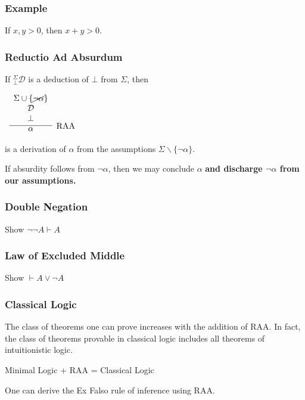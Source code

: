 \documentclass{beamer}
\theoremstyle{indentDefn} \newtheorem{defn}[]{Definition}
\begin{document}
\begin{frame}
	\frametitle{Example}

	If $x,y > 0$, then $x + y > 0$. 

	\vspace{6cm}

\end{frame}

\begin{frame}
	\frametitle{Reductio Ad Absurdum}
	
	If $^{\Sigma}_{\bot}\mathcal{D}$ is a deduction of $\bot$ from $\Sigma$, then
	
	\begin{center}		
		$\begin{array}{c}		
		\infer[\RAA]{\alpha}
		{\begin{array}{c} \Sigma \cup \{\cancel{\lnot\alpha}\} \\ \mathcal{D} \\ \bot \end{array}}
		\end{array}$
	\end{center}
	
	is a derivation of $\alpha$ from the assumptions $\Sigma \backslash\{\lnot\alpha\}$.
	
	\vspace{0.5cm}
	
	If absurdity follows from $\lnot\alpha$, then we may conclude $\alpha$ {\bf and discharge $\lnot \alpha$ from our assumptions.}
	 
\end{frame}

\begin{frame}
	\frametitle{Double Negation}	
	
	Show $\lnot\lnot A \vdash A$
	\vspace{7cm}	
	
\end{frame}

\begin{frame}
	\frametitle{Law of Excluded Middle}
	
	Show $\vdash A \lor \lnot A$
	\vspace{7cm}
	
\end{frame}

\begin{frame}
  \frametitle{Classical Logic}

	The class of theorems one can prove increases with the addition of RAA. In fact, the class of theorems provable in classical logic includes all theorems of intuitionistic logic. 

	\begin{center}
  		Minimal Logic + RAA = Classical Logic 	
	\end{center}

	One can derive the Ex Falso rule of inference using RAA. 

	\vspace{4cm}

\end{frame}
\end{document}
